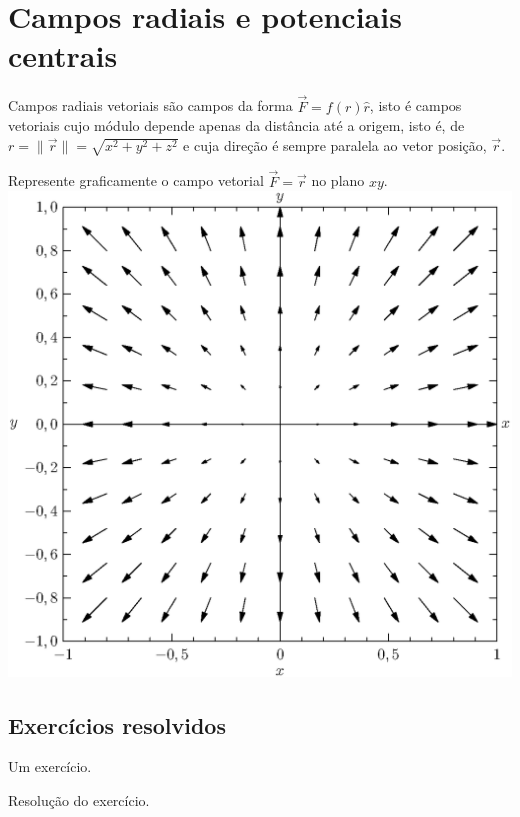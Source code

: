 
 

\section{Campos radiais e potenciais centrais}
Campos radiais vetoriais  são campos da forma $\vec{F}=f(r) \hat{r}$, isto é campos vetoriais cujo módulo depende apenas da distância até a origem, isto é, de $r=\|\vec{r}\|=\sqrt{x^2+y^2+z^2}$ e cuja direção é sempre paralela ao vetor posição, $\vec{r}$.
\begin{ex} Represente graficamente o campo vetorial $\vec{F}=\vec{r}$ no plano $xy$.
\includegraphics{cap_campos/figs/campo_radial}
\end{ex}





\construirSec

\subsection*{Exercícios resolvidos}

\construirExeresol

\begin{exeresol}
  Um exercício.
\end{exeresol}
\begin{resol}
  Resolução do exercício.
\end{resol}

